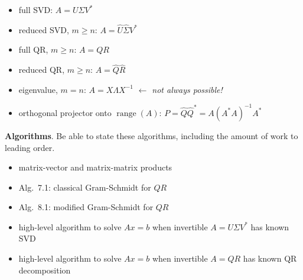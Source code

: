 \documentclass[11pt]{amsart}
\newcommand{\bigspacing}{\renewcommand{\baselinestretch}{1.21}\tiny\normalsize}
\newcommand{\range}{\operatorname{range}}
\begin{document}
\bigspacing

\begin{itemize}
\item full SVD: $A=U \Sigma V^*$
\item reduced SVD, $m\ge n$: $A=\hat U \hat \Sigma V^*$
\item full QR, $m\ge n$: $A=QR$
\item reduced QR, $m\ge n$: $A=\hat Q \hat R$
\item eigenvalue, $m=n$: $A = X\Lambda X^{-1}$ \hfill {\footnotesize\emph{$\leftarrow$ not always possible!}}
\item orthogonal projector onto $\range(A)$: $P=\hat Q\hat Q^* = A\left(A^* A\right)^{-1} A^*$
\end{itemize}

\medskip\noindent \textbf{Algorithms}. Be able to state these algorithms, including the amount of work to leading order.
\begin{itemize}
\item matrix-vector and matrix-matrix products
\item Alg.~7.1: classical Gram-Schmidt for $QR$
\item Alg.~8.1: modified Gram-Schmidt for $QR$
\item high-level algorithm to solve $Ax=b$ when invertible $A=U\Sigma V^*$ has known SVD
\item high-level algorithm to solve $Ax=b$ when invertible $A=QR$ has known QR decomposition
\end{itemize}
\end{document}
